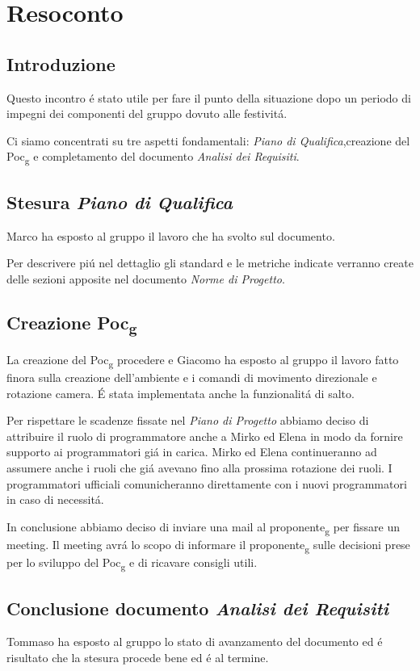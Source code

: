 \section{Resoconto}
\subsection{Introduzione}
Questo incontro é stato utile per fare il punto della situazione dopo un periodo di impegni
dei componenti del gruppo dovuto alle festivitá.

Ci siamo concentrati su tre aspetti fondamentali: \textit{Piano di Qualifica},creazione del Poc\textsubscript{g} e completamento 
del documento \textit{Analisi dei Requisiti}.
\subsection{Stesura \textit{Piano di Qualifica}}
Marco ha esposto al gruppo il lavoro che ha svolto sul documento.

Per descrivere piú nel dettaglio gli standard e le metriche indicate verranno create
delle sezioni apposite nel documento \textit{Norme di Progetto}.
\subsection{Creazione Poc\textsubscript{g}}
La creazione del Poc\textsubscript{g} procedere e Giacomo ha esposto al gruppo il lavoro
fatto finora sulla creazione dell'ambiente e i comandi di movimento direzionale e rotazione camera.
É stata implementata anche la funzionalitá di salto.

Per rispettare le scadenze fissate nel \textit{Piano di Progetto} abbiamo deciso di attribuire il ruolo di programmatore anche a Mirko ed Elena 
in modo da fornire supporto ai programmatori giá in carica.
Mirko ed Elena continueranno ad assumere anche i ruoli che giá avevano fino alla prossima rotazione dei ruoli.
I programmatori ufficiali comunicheranno direttamente con i nuovi programmatori in caso di necessitá.

In conclusione abbiamo deciso di inviare una mail al proponente\textsubscript{g} per fissare un meeting.
Il meeting avrá lo scopo di informare il proponente\textsubscript{g} sulle decisioni prese per lo sviluppo del Poc\textsubscript{g} e 
di ricavare consigli utili. 
\subsection{Conclusione documento \textit{Analisi dei Requisiti}}
Tommaso ha esposto al gruppo lo stato di avanzamento del documento ed é risultato che la stesura procede bene ed
é al termine.
